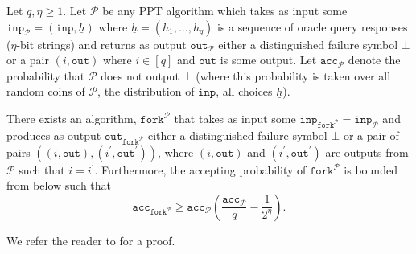 \documentclass{iacrtrans}
\theoremstyle{definition}
\numberwithin{theorem}{subsection}
\numberwithin{lemma}{theorem}
\newcommand{\adversary}{\mathcal{A}}
\begin{document}
\begin{lemma}\label{genfork}
Let $q, \eta \geq 1$. Let $\mathcal{P}$ be any PPT algorithm which takes as input some $\texttt{inp}_\mathcal{P} = (\texttt{inp}, \underline{h})$ where $\underline{h} = (h_1, \ldots, h_q)$ is a sequence of oracle query responses ($\eta$-bit strings) and returns as output $\texttt{out}_{\mathcal{P}}$ either a distinguished failure symbol $\bot$ or a pair $(i, \texttt{out})$ where $i \in [q]$ and $\texttt{out}$ is some output. Let $\texttt{acc}_{\mathcal{P}}$ denote the probability that $\mathcal{P}$ does not output $\bot$ (where this probability is taken over all random coins of $\mathcal{P}$, the distribution of $\texttt{inp}$, all choices $\underline{h}$). 

There exists an algorithm, $\texttt{fork}^{\mathcal{P}}$ that takes as input some $\texttt{inp}_{\texttt{fork}^{\mathcal{P}}} = \texttt{inp}_{\mathcal{P}}$ and produces as output $\texttt{out}_{\texttt{fork}^{\mathcal{P}}}$ either a distinguished failure symbol $\bot$ or a pair of pairs $((i, \texttt{out}), (i^\prime, \texttt{out}^\prime))$, where $(i, \texttt{out})$ and $(i^\prime, \texttt{out}^\prime)$ are outputs from $\mathcal{P}$ such that $i = i^\prime$. Furthermore, the accepting probability of $\texttt{fork}^{\mathcal{P}}$ is bounded from below such that \[\texttt{acc}_{\texttt{fork}^{\mathcal{P}}} \geq \texttt{acc}_{\mathcal{P}} \left(\frac{\texttt{acc}_{\mathcal{P}}}{q} - \frac{1}{2^\eta}\right).\]
\end{lemma}

We refer the reader to \cite{bellare2006multi} for a proof.%
\end{document}
